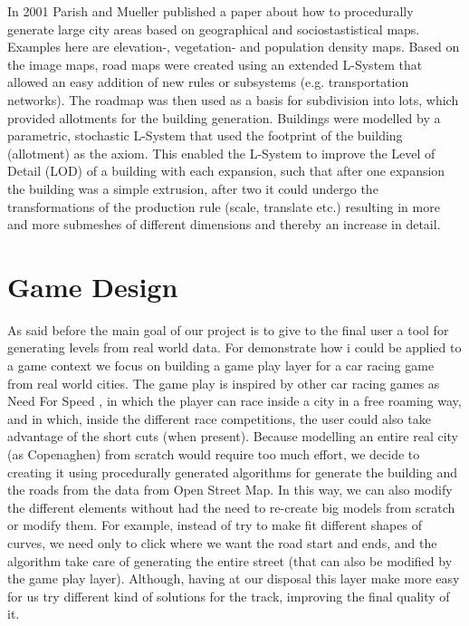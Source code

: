 \documentclass[conference]{IEEEtran}
\begin{document}
\newline
\newline
In 2001 Parish and Mueller \cite{parish} published a paper about how to procedurally generate large city areas based on geographical and sociostastistical maps. Examples here are elevation-, vegetation- and population density maps. Based on the image maps, road maps were created using an extended L-System that allowed an easy addition of new rules or subsystems (e.g. transportation networks). The roadmap was then used as a basis for subdivision into lots, which provided allotments for the building generation. Buildings were modelled by a parametric, stochastic L-System that used the footprint of the building (allotment) as the axiom. This enabled the L-System to improve the Level of Detail (LOD) of a building with each expansion, such that after one expansion the building was a simple extrusion, after two it could undergo the transformations of the production rule (scale, translate etc.) resulting in more and more submeshes of different dimensions and thereby an increase in detail.


\section{Game Design}

As said before the main goal of our project is to give to the final user a tool for generating levels from real world data. For demonstrate how i could be applied  to a game context we focus on building a game play layer for a car racing game from real world cities. The game play is inspired by other car racing games as Need For Speed \cite{nfs}, in which the player can race inside a city in a free roaming way, and in which, inside the different race competitions, the user could also take advantage of the short cuts (when present). Because modelling an entire real city (as Copenaghen) from scratch would require too much effort, we decide to creating it using procedurally generated algorithms for generate the building and the roads from the data from Open Street Map. In this way, we can also modify the different elements without had the need to re-create big models from scratch or modify them. For example, instead of try to make fit different shapes of curves, we need only to click where we want the road start and ends, and the algorithm take care of generating the entire street (that can also be modified by the game play layer). Although, having at our disposal this layer make more easy for us try different kind of solutions for the track, improving the final quality of it.
\end{document}
